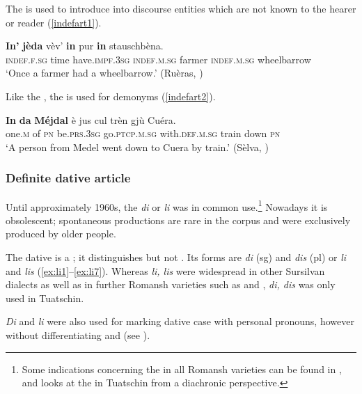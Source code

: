 The  is used to introduce into discourse entities which are not known to the hearer or reader (\ref{indefart1}). 

\ea\label{indefart1}
\gll \textbf{In'} \textbf{jèda}\footnotemark{} vèv’ \textbf{in} pur \textbf{in} stauschbèna.\\
     \textsc{indef.f.sg} time have.\textsc{impf.3sg} \textsc{indef.m.sg} farmer \textsc{indef.m.sg} wheelbarrow \\
\glt `Once a farmer had a wheelbarrow.' (Ruèras, \citealt[66]{Büchli1966})
\z

Like the , the  is used for demonyms (\ref{indefart2}).

\ea\label{indefart2}
\gll   \textbf{In} \textbf{da} \textbf{Méjdal} è jus cul trèn gjù Cuéra.\\
     one.\textsc{m} of \textsc{pn} be.\textsc{prs.3sg} go.\textsc{ptcp.m.sg} with.\textsc{def.m.sg} train down \textsc{pn}\\
\glt `A person from Medel went down to Cuera by train.' (Sèlva, \citealt[52]{Büchli1966})
\z

\subsubsection{Definite dative article}\label{sec:3.2.1.3}
Until approximately 1960s, the  \textit{di} or \textit{li} was in common use.\footnote{Some indications concerning the  in all Romansh varieties can be found in \citet{Linder1987}, and \citet{Maurer2017} looks at the  in Tuatschin from a diachronic perspective.} Nowadays it is obsolescent; spontaneous productions are rare in the corpus and were exclusively produced by older people.

The dative  is a ; it distinguishes  but not . Its forms are \textit{di} (sg) and \textit{dis} (pl) or \textit{li} and \textit{lis} (\ref{ex:li1}--\ref{ex:li7}).  Whereas \textit{li, lis} were widespread in other Sursilvan dialects as well as in further  Romansh varieties such as  and , \textit{di, dis} was only used in Tuatschin.

\textit{Di} and \textit{li} were also used for marking dative case with personal pronouns, however without differentiating  and  (see  ).

